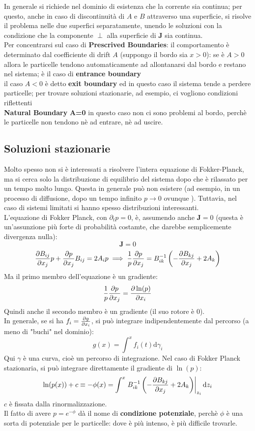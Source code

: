 \documentclass[a4paper,12pt]{article}
\newcommand{\eva}[2]{\left.#1\right|_{#2}}
\theoremstyle{plain}
\renewcommand{\vec}[1]{{\boldsymbol{#1}}}
\theoremstyle{definition}
\newcommand{\f}[2]{\frac{#1}{#2}}
\newcommand{\tdv}{\partial_t}
\renewcommand{\d}{\text{d}}
\newcommand{\ra}{\rightarrow}
\theoremstyle{remark}
\begin{document}
In generale si richiede nel dominio di esistenza che la corrente sia continua; per questo, anche in caso di discontinuità di $A$ e $B$ attraverso una superficie, si risolve il problema nelle due superfici separatamente, unendo le soluzioni con la condizione che la componente $\perp$ alla superficie di $\vec{J}$ sia continua.\\ Per concentrarsi sul caso di \textbf{Prescrived Boundaries}: il comportamento è determinato dal coefficiente di drift $A$ (suppongo il bordo sia $x>0$):
se è $A>0$ allora le particelle tendono automaticamente ad allontanarsi dal bordo e restano nel sistema; è il caso di \textbf{entrance boundary}\\il caso $A<0$ è detto \textbf{exit boundary} ed in questo caso il sistema tende a perdere particelle; per trovare soluzioni stazionarie, ad esempio, ci vogliono condizioni riflettenti\\\textbf{Natural Boundary} \textbf{A=0} in questo caso non ci sono problemi al bordo, perchè le particelle non tendono nè ad entrare, nè ad uscire.
\subsection{Soluzioni stazionarie}
Molto spesso non si è interessati a risolvere l'intera equazione di Fokker-Planck, ma si cerca solo la distribuzione di equilibrio del sistema dopo che è rilassato per un tempo molto lungo. Questa in generale può non esistere (ad esempio, in un processo di diffusione, dopo un tempo infinito $p\ra0$ ovunque ). Tuttavia, nel caso di sistemi  limitati si hanno spesso distribuzioni interessanti. \\L'equazione di Fokker Planck, con $\tdv p=0$, è, assumendo anche $\vec{J}=0$ (questa è un'assunzione più forte di probabilità costamte, che darebbe semplicemente divergenza nulla):
\[\vec{J}=0\]
\[\pdv{B_{ij} }{x_j }p+\pdv{p}{x_j} B_{ij}=2 A_i p\implies \f{1}{p}\pdv{p}{x_j}=B^{-1}_{ik}	\left(-\pdv{B_{kj}}{x_j}+2A_k				\right)\]
Ma il primo membro dell'equazione è un gradiente:
\[\f{1}{p}\pdv{p}{x_j}=\pdv{\ln(p)}{x_i}\]
Quindi anche il secondo membro è un gradiente (il suo rotore è $0$).\\ In generale, se si ha $f_i=\pdv{g}{x_i}$, si può integrare indipendentemente dal percorso (a meno di "buchi" nel dominio):
\[g(x)=\int^{x} f_i(t)	\d \gamma_i		\]
Qui $\gamma$ è una curva, cioè un percorso di integrazione. Nel caso di Fokker Planck stazionaria, si può integrare direttamente il gradiente di $\ln(p)$:
\[\ln(p(x))+c\equiv-\phi(x)=\int^x	\eva{B^{-1}_{ik}	\left(-\pdv{B_{kj}}{x_j}+2A_k				\right) }{z_i}\d z_i\label{staz}		\]
$c$ è fissata dalla rinormalizzazione. \\Il fatto di avere $p=e^{-\phi}$ dà il nome di \textbf{condizione potenziale}, perchè $\phi$ è una sorta di potenziale per le particelle: dove è più intenso, è più difficile trovarle.
\end{document}
